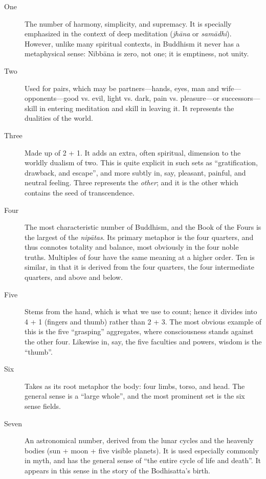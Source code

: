 \documentclass[12pt,openany]{book}%
\begin{document}
\begin{description}%
\item[One] The number of harmony, simplicity, and supremacy. It is specially emphasized in the context of deep meditation (\textit{\textsanskrit{jhāna}} or \textit{\textsanskrit{samādhi}}). However, unlike many spiritual contexts, in Buddhism it never has a metaphysical sense: \textsanskrit{Nibbāna} is zero, not one; it is emptiness, not unity.%
\item[Two] Used for pairs, which may be partners—hands, eyes, man and wife—opponents—good vs. evil, light vs. dark, pain vs. pleasure—or successors—skill in entering meditation and skill in leaving it. It represents the dualities of the world.%
\item[Three] Made up of 2 + 1. It adds an extra, often spiritual, dimension to the worldly dualism of two. This is quite explicit in such sets as “gratification, drawback, and escape”, and more subtly in, say, pleasant, painful, and neutral feeling. Three represents the \emph{other}; and it is the other which contains the seed of transcendence.%
\item[Four] The most characteristic number of Buddhism, and the Book of the Fours is the largest of the \textit{\textsanskrit{nipātas}}. Its primary metaphor is the four quarters, and thus connotes totality and balance, most obviously in the four noble truths. Multiples of four have the same meaning at a higher order. Ten is similar, in that it is derived from the four quarters, the four intermediate quarters, and above and below.%
\item[Five] Stems from the hand, which is what we use to count; hence it divides into 4 + 1 (fingers and thumb) rather than 2 + 3. The most obvious example of this is the five “grasping” aggregates, where consciousness stands against the other four. Likewise in, say, the five faculties and powers, wisdom is the “thumb”.%
\item[Six] Takes as its root metaphor the body: four limbs, torso, and head. The general sense is a “large whole”, and the most prominent set is the six sense fields.%
\item[Seven] An astronomical number, derived from the lunar cycles and the heavenly bodies (sun + moon + five visible planets). It is used especially commonly in myth, and has the general sense of “the entire cycle of life and death”. It appears in this sense in the story of the Bodhisatta’s birth.%
\end{description}
\end{document}
